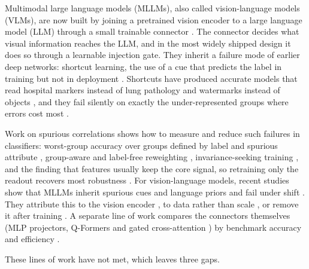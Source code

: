 Multimodal large language models (MLLMs), also called vision-language models (VLMs), are now built by joining a
pretrained vision encoder to a large language model (LLM) through a small trainable connector \citep{yin2024mllmsurvey,huang2025vitsurvey,awais2025foundation}.
The connector decides what visual information reaches the LLM, and in the most widely shipped design it does so
through a learnable injection gate. They inherit a failure mode of earlier deep networks: shortcut learning, the use of a cue that predicts
the label in training but not in deployment \citep{geirhos2020shortcut}. Shortcuts have produced accurate models that
read hospital markers instead of lung pathology \citep{degrave2021covid} and watermarks instead of objects
\citep{lapuschkin2019clever}, and they fail silently on exactly the under-represented groups where errors cost most
\citep{brown2023shortcut,ongly2024shortcut}.

Work on spurious correlations shows how to measure and reduce such failures in classifiers: worst-group accuracy
over groups defined by label and spurious attribute \citep{sagawa2020groupdro}, group-aware and label-free reweighting
\citep{liu2021jtt,idrissi2022balancing}, invariance-seeking training \citep{huang2024losingtickets,mitchell2026wule}, and the
finding that features usually keep the core signal, so retraining only the readout recovers most robustness
\citep{izmailov2022feature,kirichenko2023dfr}. For vision-language models, recent studies show that MLLMs inherit spurious
cues and language priors and fail under shift \citep{hosseini2025spurlens,yang2025spuriverse,ye2026mmspubench,zhu2024vlalignood}. They attribute this to the vision encoder \citep{tong2024eyes}, to data rather than scale
\citep{sarridis2026scaling}, or remove it after training \citep{sarker2026purge}. A separate line of work compares the
connectors themselves (MLP projectors, Q-Formers and gated cross-attention \citep{liu2024llava15,li2023blip2,alayrac2022flamingo}) by benchmark accuracy and efficiency \citep{mckinzie2024mm1,cha2024honeybee,karamcheti2024prismatic}.

These lines of work have not met, which leaves three gaps.


